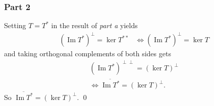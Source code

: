 \documentclass{unswmaths}
\begin{document}
\subsubsection*{Part 2}
Setting $ T = T^* $ in the result of \emph{part a} yields
\begin{align*}
    &(\operatorname{Im} T^*)^\perp = \ker T^{**}
    & \Leftrightarrow  (\operatorname{Im} T^*)^\perp = \ker T
\end{align*}
and taking orthogonal complements of both sides gets
\begin{align*}
    & (\operatorname{Im} T^*)^{\perp \perp} = (\ker T)^\perp \\
    & \Leftrightarrow \overline{\operatorname{Im} T^*} = (\ker T)^\perp.
\end{align*}
So $ \overline{\operatorname{Im} T^*} = (\ker T)^\perp $. \qed
\end{document}
